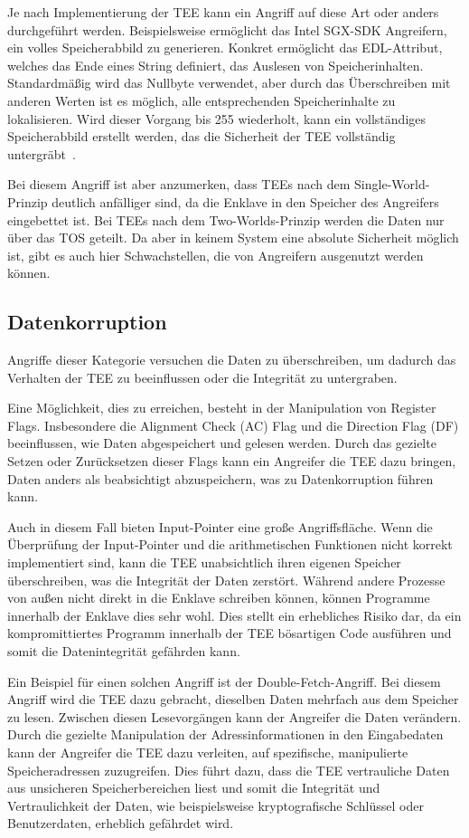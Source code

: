 Je nach Implementierung der TEE kann ein Angriff auf diese Art oder anders durchgeführt werden. Beispielsweise ermöglicht das Intel SGX-SDK Angreifern, ein volles Speicherabbild zu generieren. Konkret ermöglicht das EDL-Attribut, welches das Ende eines String definiert, das Auslesen von Speicherinhalten. Standardmäßig wird das Nullbyte verwendet, aber durch das Überschreiben mit anderen Werten ist es möglich, alle entsprechenden Speicherinhalte zu lokalisieren. Wird dieser Vorgang bis 255 wiederholt, kann ein vollständiges Speicherabbild erstellt werden, das die Sicherheit der TEE vollständig untergräbt~\cite{IntelSGX, TEEPaper}.

Bei diesem Angriff ist aber anzumerken, dass TEEs nach dem Single-World-Prinzip deutlich anfälliger sind, da die Enklave in den Speicher des Angreifers eingebettet ist. Bei TEEs nach dem Two-Worlds-Prinzip werden die Daten nur über das TOS geteilt. Da aber in keinem System eine absolute Sicherheit möglich ist, gibt es auch hier Schwachstellen, die von Angreifern ausgenutzt werden können.

\subsection{Datenkorruption}
Angriffe dieser Kategorie versuchen die Daten zu überschreiben, um dadurch das Verhalten der TEE zu beeinflussen oder die Integrität zu untergraben.

Eine Möglichkeit, dies zu erreichen, besteht in der Manipulation von Register Flags. Insbesondere die Alignment Check (AC) Flag und die Direction Flag (DF) beeinflussen, wie Daten abgespeichert und gelesen werden. Durch das gezielte Setzen oder Zurücksetzen dieser Flags kann ein Angreifer die TEE dazu bringen, Daten anders als beabsichtigt abzuspeichern, was zu Datenkorruption führen kann.

Auch in diesem Fall bieten Input-Pointer eine große Angriffsfläche. Wenn die Überprüfung der Input-Pointer und die arithmetischen Funktionen nicht korrekt implementiert sind, kann die TEE unabsichtlich ihren eigenen Speicher überschreiben, was die Integrität der Daten zerstört. Während andere Prozesse von außen nicht direkt in die Enklave schreiben können, können Programme innerhalb der Enklave dies sehr wohl. Dies stellt ein erhebliches Risiko dar, da ein kompromittiertes Programm innerhalb der TEE bösartigen Code ausführen und somit die Datenintegrität gefährden kann.


Ein Beispiel für einen solchen Angriff ist der Double-Fetch-Angriff. Bei diesem Angriff wird die TEE dazu gebracht, dieselben Daten mehrfach aus dem Speicher zu lesen. Zwischen diesen Lesevorgängen kann der Angreifer die Daten verändern. Durch die gezielte Manipulation der Adressinformationen in den Eingabedaten kann der Angreifer die TEE dazu verleiten, auf spezifische, manipulierte Speicheradressen zuzugreifen. Dies führt dazu, dass die TEE vertrauliche Daten aus unsicheren Speicherbereichen liest und somit die Integrität und Vertraulichkeit der Daten, wie beispielsweise kryptografische Schlüssel oder Benutzerdaten, erheblich gefährdet wird.


